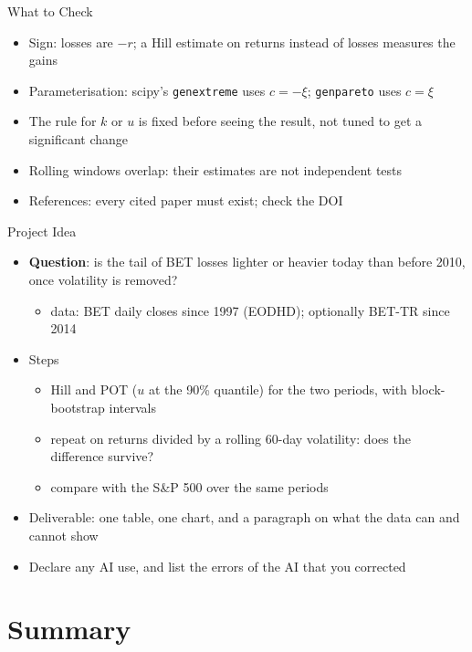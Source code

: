 \begin{frame}{What to Check}
\itemsize{\small}
\begin{itemize}
    \item Sign: losses are $-r$; a Hill estimate on returns instead of losses measures the gains
    \item Parameterisation: scipy's \texttt{genextreme} uses $c = -\xi$; \texttt{genpareto} uses $c = \xi$
    \item The rule for $k$ or $u$ is fixed before seeing the result, not tuned to get a significant change
    \item Rolling windows overlap: their estimates are not independent tests
    \item References: every cited paper must exist; check the DOI
\end{itemize}
\end{frame}

\begin{frame}{Project Idea}
\itemsize{\small}
\begin{itemize}
    \item \textbf{Question}: is the tail of BET losses lighter or heavier today than before 2010, once volatility is removed?
    \begin{itemize}
        \item data: BET daily closes since 1997 (EODHD); optionally BET-TR since 2014
    \end{itemize}
    \item Steps
    \begin{itemize}
        \item Hill and POT ($u$ at the 90\% quantile) for the two periods, with block-bootstrap intervals
        \item repeat on returns divided by a rolling 60-day volatility: does the difference survive?
        \item compare with the S\&P 500 over the same periods
    \end{itemize}
    \item Deliverable: one table, one chart, and a paragraph on what the data can and cannot show
    \item Declare any AI use, and list the errors of the AI that you corrected
\end{itemize}
\end{frame}


\section{Summary}

